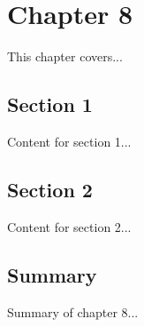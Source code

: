 \chapter{Chapter 8}

This chapter covers...

\section{Section 1}

Content for section 1...

\section{Section 2}

Content for section 2...

\section{Summary}

Summary of chapter 8...

